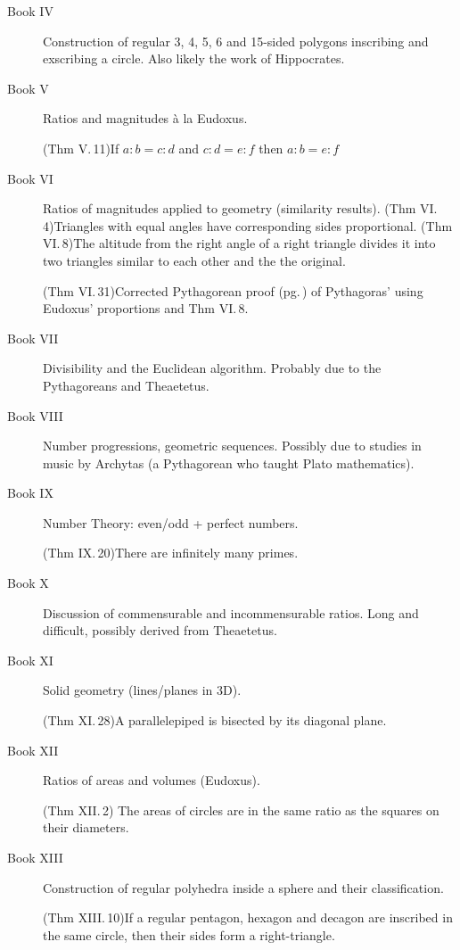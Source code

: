 \begin{description}
\item[Book IV]\lstsp Construction of regular 3, 4, 5, 6 and 15-sided polygons inscribing and exscribing a circle. Also likely the work of Hippocrates.

\item[Book V]\lstsp Ratios and magnitudes à la Eudoxus.\par
	(Thm V.\,11)\lstsp If $a:b=c:d$ and $c:d=e:f$ then $a:b=e:f$


\item[Book VI]\lstsp Ratios of magnitudes applied to geometry (similarity results).\smallbreak
  (Thm VI.\,4)\lstsp Triangles with equal angles have corresponding sides proportional.\smallbreak
  (Thm VI.\,8)\lstsp The altitude from the right angle of a right triangle divides it into two triangles similar to each other and the the original.\par
  (Thm VI.\,31)\lstsp Corrected Pythagorean proof (pg.\,\pageref{pthagorig}) of Pythagoras' using Eudoxus' proportions and Thm VI.\,8.
  

\item[Book VII]\lstsp Divisibility and the Euclidean algorithm. Probably due to the Pythagoreans and Theaetetus.


\item[Book VIII]\lstsp Number progressions, geometric sequences. Possibly due to studies in music by Archytas (a Pythagorean who taught Plato mathematics).


\item[Book IX]\lstsp Number Theory: even/odd + perfect numbers.\par
(Thm IX.\,20)\lstsp There are infinitely many primes.


\item[Book X]\lstsp Discussion of commensurable and incommensurable ratios. Long and difficult, possibly derived from Theaetetus.


\item[Book XI]\lstsp Solid geometry (lines/planes in 3D).\par
	(Thm XI.\,28)\lstsp A parallelepiped is bisected by its diagonal plane.
	
	
\item[Book XII]\lstsp Ratios of areas and volumes (Eudoxus).\par
	(Thm XII.\,2) The areas of circles are in the same ratio as the squares on their diameters.


\item[Book XIII]\lstsp Construction of regular polyhedra inside a sphere and their classification.\par
	(Thm XIII.\,10)\lstsp If a regular pentagon, hexagon and decagon are inscribed in the same circle, then their sides form a right-triangle.
\end{description}

